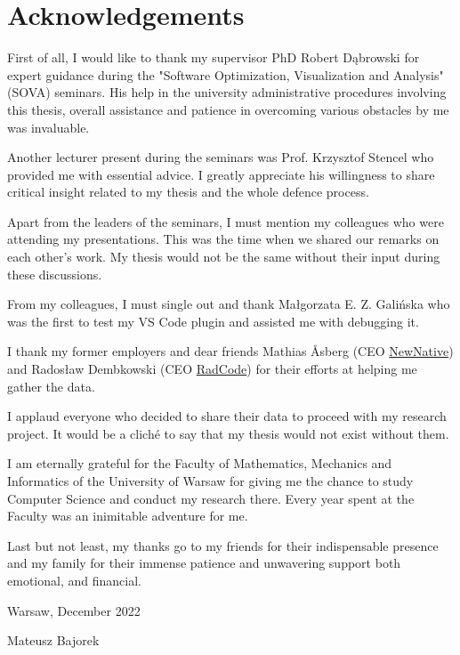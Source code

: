 \chapter*{Acknowledgements}

First of all, I would like to thank my supervisor PhD Robert Dąbrowski for expert guidance during the "Software Optimization, Visualization and Analysis" (SOVA) seminars. His help in the university administrative procedures involving this thesis, overall assistance and patience in overcoming various obstacles by me was invaluable.

Another lecturer present during the seminars was Prof. Krzysztof Stencel who provided me with essential advice. I greatly appreciate his willingness to share critical insight related to my thesis and the whole defence process.

Apart from the leaders of the seminars, I must mention my colleagues who were attending my presentations. This was the time when we shared our remarks on each other's work. My thesis would not be the same without their input during these discussions.

From my colleagues, I must single out and thank Małgorzata E. Z. Galińska who was the first to test my VS Code plugin and assisted me with debugging it.

I thank my former employers and dear friends Mathias Åsberg (CEO \href{https://newnative.ai/}{NewNative}) and Radosław Dembkowski (CEO \href{https://www.radcode.co/}{RadCode}) for their efforts at helping me gather the data.

I applaud everyone who decided to share their data to proceed with my research project. It would be a cliché to say that my thesis would not exist without them.

I am eternally grateful for the Faculty of Mathematics, Mechanics and Informatics of the University of Warsaw for giving me the chance to study Computer Science and conduct my research there. Every year spent at the Faculty was an inimitable adventure for me.

Last but not least, my thanks go to my friends for their indispensable presence and my family for their immense patience and unwavering support both emotional, and financial.

\begin{flushright}
Warsaw, December 2022

Mateusz Bajorek
\end{flushright}
